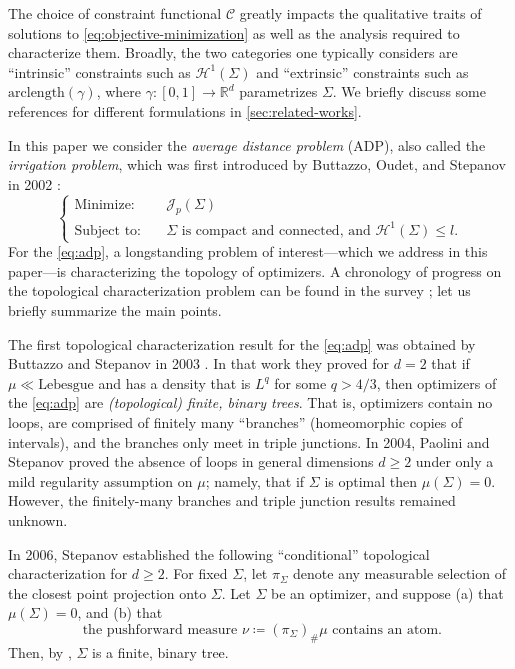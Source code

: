 \documentclass[preprint, reqno]{amsart}
\theoremstyle{definition}
\numberwithin{equation}{section}
\begin{document}
The choice of constraint functional $\mathscr C$ greatly impacts the
qualitative traits of solutions to \eqref{eq:objective-minimization}
as well as the analysis required to characterize them. Broadly, the
two categories one typically considers are ``intrinsic'' constraints
such as $\mathcal H^1(\Sigma)$ and ``extrinsic'' constraints such as
$\mathrm{arclength}(\gamma)$, where $\gamma : [0,1] \to \mathbb R^d$
parametrizes $\Sigma$. We briefly discuss some references for
different formulations in \cref{sec:related-works}.

In this paper we consider the \emph{average distance problem} (ADP),
also called the \emph{irrigation problem}, which was first introduced
by Buttazzo, Oudet, and Stepanov in 2002 \cite{Buttazzo02}:
\begin{equation}
  \label{eq:adp}
  \begin{cases}
    \text{Minimize:} \quad
    & \mathscr J_p(\Sigma) \\
    \text{Subject to:} \quad
    & \Sigma \text{ is compact and connected, and } \mathcal H^1(\Sigma)
    \leq l.
  \end{cases}
  \tag{ADP}
\end{equation}
For the \eqref{eq:adp}, a longstanding problem of interest---which we
address in this paper---is characterizing the topology of optimizers.
A chronology of progress on the topological characterization problem
can be found in the survey \cite{Lemenant12}; let us briefly summarize
the main points.

The first topological characterization result for the \eqref{eq:adp}
was obtained by Buttazzo and Stepanov in 2003 \cite{Buttazzo03}. In
that work they proved for $d = 2$ that if $\mu \ll \mathrm{Lebesgue}$
and has a density that is $L^q$ for some $q > 4/3$, then optimizers of
the \eqref{eq:adp} are \emph{(topological) finite, binary trees}. That
is, optimizers contain no loops, are comprised of finitely many
``branches'' (homeomorphic copies of intervals), and the branches only
meet in triple junctions. In 2004, Paolini and Stepanov proved the
absence of loops in general dimensions $d \geq 2$ \cite[Theorem
5.6]{Stepanov04} under only a mild regularity assumption on $\mu$;
namely, that if $\Sigma$ is optimal then $\mu(\Sigma) = 0$. However,
the finitely-many branches and triple junction results remained
unknown.

In 2006, Stepanov \cite{Stepanov06} established the following
``conditional'' topological characterization for $d \geq 2$. For fixed
$\Sigma$, let $\pi_\Sigma$ denote any measurable selection of the
closest point projection onto $\Sigma$. Let $\Sigma$ be an optimizer,
and suppose (a) that $\mu(\Sigma) = 0$, and (b) that
\begin{equation}
  \text{ the pushforward measure }\nu \coloneqq (\pi_\Sigma)_{\#} \mu
  \text{ contains an atom.} \label{eq:existence-of-atom}
\end{equation}
Then, by \cite[Theorem 5.5]{Stepanov06}, $\Sigma$ is a finite, binary
tree.
\end{document}
